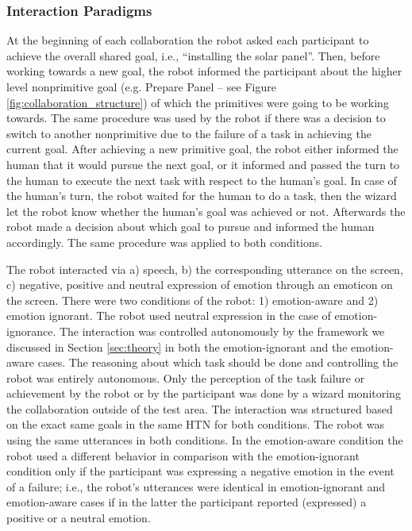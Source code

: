\documentclass[12pt]{report}
\begin{document}
\subsubsection{Interaction Paradigms}
\label{sec-interaction-paradigms}
At the beginning of each collaboration the robot asked each participant to
achieve the overall shared goal, i.e., ``installing the solar panel''. Then,
before working towards a new goal, the robot informed the participant about the
higher level nonprimitive goal (e.g. Prepare Panel -- see Figure
\ref{fig:collaboration_structure}) of which the primitives were going to be
working towards. The same procedure was used by the robot if there was a
decision to switch to another nonprimitive due to the failure of a task in
achieving the current goal. After achieving a new primitive goal, the robot
either informed the human that it would pursue the next goal, or it informed and
passed the turn to the human to execute the next task with respect to the
human's goal. In case of the human's turn, the robot waited for the human to do
a task, then the wizard let the robot know whether the human's goal was achieved
or not. Afterwards the robot made a decision about which goal to pursue and
informed the human accordingly. The same procedure was applied to both
conditions.

The robot interacted via a) speech, b) the corresponding utterance on the
screen, c) negative, positive and neutral expression of emotion through an
emoticon on the screen. There were two conditions of the robot: 1)
emotion-aware and 2) emotion ignorant. The robot used neutral expression in the
case of emotion-ignorance. The interaction was controlled autonomously by the
framework we discussed in Section \ref{sec:theory} in both the emotion-ignorant
and the emotion-aware cases. The reasoning about which task should be done and
controlling the robot was entirely autonomous. Only the perception of the task
failure or achievement by the robot or by the participant was done by a wizard
monitoring the collaboration outside of the test area. The interaction was
structured based on the exact same goals in the same HTN for both conditions.
The robot was using the same utterances in both conditions. In the emotion-aware
condition the robot used a different behavior in comparison with the
emotion-ignorant condition only if the participant was expressing a negative
emotion in the event of a failure; i.e., the robot's utterances were identical
in emotion-ignorant and emotion-aware cases if in the latter the participant
reported (expressed) a positive or a neutral emotion.
\end{document}
